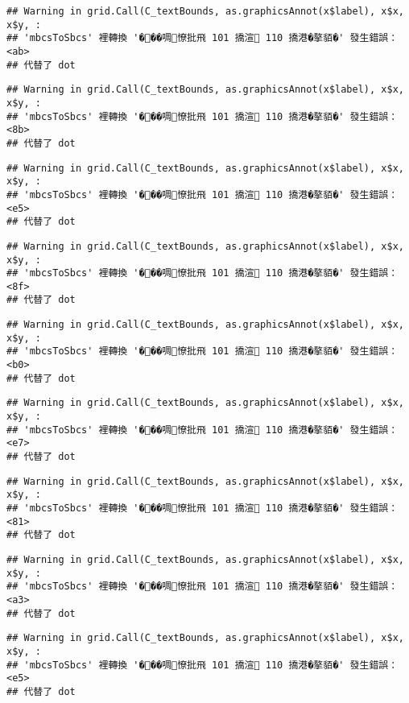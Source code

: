 \documentclass[
]{article}
\begin{document}
\begin{verbatim}
## Warning in grid.Call(C_textBounds, as.graphicsAnnot(x$label), x$x, x$y, :
## 'mbcsToSbcs' 裡轉換 '���啁憭批飛 101 撟渲 110 撟港�摮貊�' 發生錯誤：<ab>
## 代替了 dot
\end{verbatim}

\begin{verbatim}
## Warning in grid.Call(C_textBounds, as.graphicsAnnot(x$label), x$x, x$y, :
## 'mbcsToSbcs' 裡轉換 '���啁憭批飛 101 撟渲 110 撟港�摮貊�' 發生錯誤：<8b>
## 代替了 dot
\end{verbatim}

\begin{verbatim}
## Warning in grid.Call(C_textBounds, as.graphicsAnnot(x$label), x$x, x$y, :
## 'mbcsToSbcs' 裡轉換 '���啁憭批飛 101 撟渲 110 撟港�摮貊�' 發生錯誤：<e5>
## 代替了 dot
\end{verbatim}

\begin{verbatim}
## Warning in grid.Call(C_textBounds, as.graphicsAnnot(x$label), x$x, x$y, :
## 'mbcsToSbcs' 裡轉換 '���啁憭批飛 101 撟渲 110 撟港�摮貊�' 發生錯誤：<8f>
## 代替了 dot
\end{verbatim}

\begin{verbatim}
## Warning in grid.Call(C_textBounds, as.graphicsAnnot(x$label), x$x, x$y, :
## 'mbcsToSbcs' 裡轉換 '���啁憭批飛 101 撟渲 110 撟港�摮貊�' 發生錯誤：<b0>
## 代替了 dot
\end{verbatim}

\begin{verbatim}
## Warning in grid.Call(C_textBounds, as.graphicsAnnot(x$label), x$x, x$y, :
## 'mbcsToSbcs' 裡轉換 '���啁憭批飛 101 撟渲 110 撟港�摮貊�' 發生錯誤：<e7>
## 代替了 dot
\end{verbatim}

\begin{verbatim}
## Warning in grid.Call(C_textBounds, as.graphicsAnnot(x$label), x$x, x$y, :
## 'mbcsToSbcs' 裡轉換 '���啁憭批飛 101 撟渲 110 撟港�摮貊�' 發生錯誤：<81>
## 代替了 dot
\end{verbatim}

\begin{verbatim}
## Warning in grid.Call(C_textBounds, as.graphicsAnnot(x$label), x$x, x$y, :
## 'mbcsToSbcs' 裡轉換 '���啁憭批飛 101 撟渲 110 撟港�摮貊�' 發生錯誤：<a3>
## 代替了 dot
\end{verbatim}

\begin{verbatim}
## Warning in grid.Call(C_textBounds, as.graphicsAnnot(x$label), x$x, x$y, :
## 'mbcsToSbcs' 裡轉換 '���啁憭批飛 101 撟渲 110 撟港�摮貊�' 發生錯誤：<e5>
## 代替了 dot
\end{verbatim}
\end{document}
